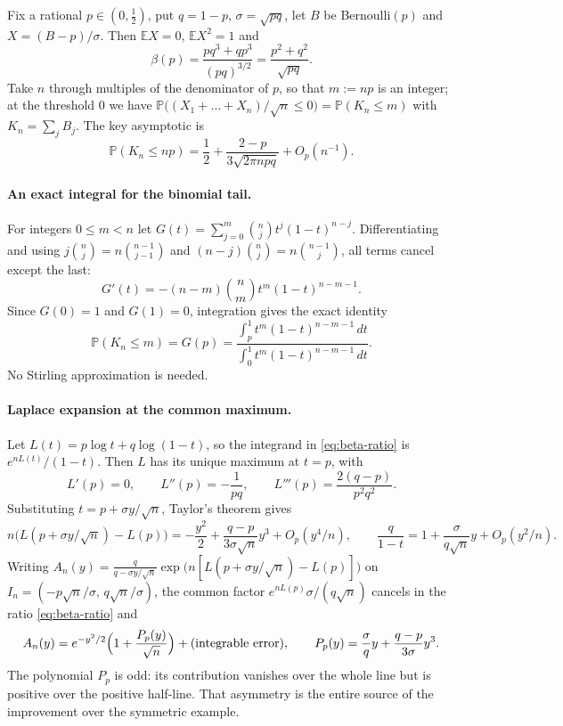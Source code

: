 \documentclass[10pt,a4paper]{article}
\theoremstyle{plain}
\theoremstyle{definition}
\newcommand{\E}{\mathbb{E}}
\newcommand{\PR}{\mathbb{P}}
\newcommand{\bigO}{O}
\begin{document}
Fix a rational $p\in(0,\tfrac12)$, put $q=1-p$, $\sigma=\sqrt{pq}$, let $B$ be
Bernoulli$(p)$ and $X=(B-p)/\sigma$. Then $\E X=0$, $\E X^2=1$ and
\[
  \beta(p) = \frac{pq^3+qp^3}{(pq)^{3/2}} = \frac{p^2+q^2}{\sqrt{pq}} .
\]
Take $n$ through multiples of the denominator of $p$, so that $m:=np$ is an
integer; at the threshold $0$ we have
$\PR\bigl((X_1+\dots+X_n)/\sqrt n\le0\bigr)=\PR(K_n\le m)$ with
$K_n=\sum_j B_j$. The key asymptotic is
\begin{equation}\label{eq:esseen-key}
  \PR(K_n\le np) = \frac12 + \frac{2-p}{3\sqrt{2\pi npq}} + \bigO_p(n^{-1}).
\end{equation}

\paragraph{An exact integral for the binomial tail.}
For integers $0\le m<n$ let $G(t)=\sum_{j=0}^{m}\binom nj t^j(1-t)^{n-j}$.
Differentiating and using $j\binom nj=n\binom{n-1}{j-1}$ and
$(n-j)\binom nj=n\binom{n-1}{j}$, all terms cancel except the last:
\[
  G'(t) = -(n-m)\binom nm t^m(1-t)^{n-m-1}.
\]
Since $G(0)=1$ and $G(1)=0$, integration gives the exact identity
\begin{equation}\label{eq:beta-ratio}
  \PR(K_n\le m) = G(p)
  = \frac{\int_p^1 t^m(1-t)^{n-m-1}\,dt}{\int_0^1 t^m(1-t)^{n-m-1}\,dt} .
\end{equation}
No Stirling approximation is needed.

\paragraph{Laplace expansion at the common maximum.}
Let $L(t)=p\log t+q\log(1-t)$, so the integrand in \eqref{eq:beta-ratio} is
$e^{nL(t)}/(1-t)$. Then $L$ has its unique maximum at $t=p$, with
\[
  L'(p)=0,\qquad L''(p)=-\frac1{pq},\qquad L'''(p)=\frac{2(q-p)}{p^2q^2}.
\]
Substituting $t=p+\sigma y/\sqrt n$, Taylor's theorem gives
\[
  n\bigl(L(p+\sigma y/\sqrt n)-L(p)\bigr)
  = -\frac{y^2}{2} + \frac{q-p}{3\sigma\sqrt n}y^3 + \bigO_p(y^4/n),
  \qquad
  \frac{q}{1-t} = 1 + \frac{\sigma}{q\sqrt n}y + \bigO_p(y^2/n).
\]
Writing
$A_n(y)=\frac{q}{q-\sigma y/\sqrt n}\exp\bigl(n[L(p+\sigma y/\sqrt n)-L(p)]\bigr)$
on $I_n=(-p\sqrt n/\sigma,\,q\sqrt n/\sigma)$, the common factor
$e^{nL(p)}\sigma/(q\sqrt n)$ cancels in the ratio \eqref{eq:beta-ratio} and
\begin{equation}\label{eq:An-expansion}
  A_n(y) = e^{-y^2/2}\Bigl(1+\frac{P_p(y)}{\sqrt n}\Bigr)
  + (\text{integrable error}),
  \qquad
  P_p(y) = \frac{\sigma}{q}y + \frac{q-p}{3\sigma}y^3 .
\end{equation}
The polynomial $P_p$ is odd: its contribution vanishes over the whole line but
is positive over the positive half-line. That asymmetry is the entire source of
the improvement over the symmetric example.
\end{document}
